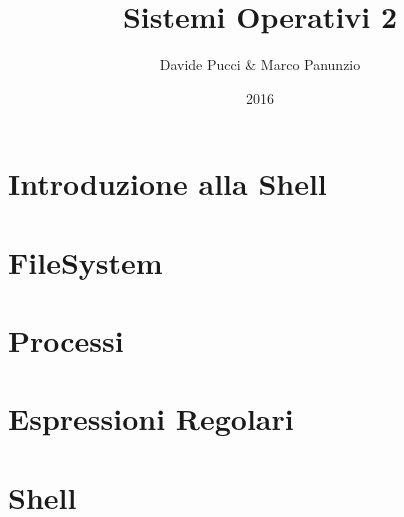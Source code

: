 

\title{Sistemi Operativi 2}
\author{Davide Pucci \& Marco Panunzio}
\date{2016}

\maketitle
\tableofcontents

\chapter{Introduzione alla Shell}


\chapter{FileSystem}


\chapter{Processi}


\chapter{Espressioni Regolari}


\chapter{Shell}


